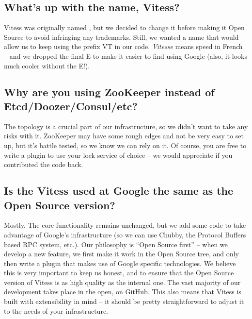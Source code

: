 \subsection{What’s up with the name, Vitess?}\label{whats-up-with-the-name-vitess}

Vitess was originally named , but we decided to change it
before making it Open Source to avoid infringing any
trademarks. Still, we wanted a name that would allow us to keep using
the prefix VT in our code. \emph{Vitesse} means speed in French – and we
dropped the final E to make it easier to find using Google (also, it
looks much cooler without the E!).

\subsection{Why are you using ZooKeeper instead of Etcd/Doozer/Consul/etc?}\hypertarget{why-are-you-using-zookeeper-instead-of-etcddoozerconsuletc}{}\label{why-are-you-using-zookeeper-instead-of-etcddoozerconsuletc}

The topology is a crucial part of our infrastructure, so we didn’t
want to take any risks with it. ZooKeeper may have some rough edges
and not be very easy to set up, but it’s battle tested, so we know we
can rely on it. Of course, you are free to write a plugin to use your
lock service of choice – we would appreciate if you contributed the
code back.

\subsection{Is the Vitess used at Google the same as the Open Source version?}\hypertarget{is-the-vitess-used-at-google-the-same-as-the-open-source-version}{}\label{is-the-vitess-used-at-google-the-same-as-the-open-source-version}

Mostly. The core functionality remains unchanged, but we add some code
to take advantage of Google’s infrastructure (so we can use \cite{web:chubby} Chubby,
the Protocol Buffers based RPC system, etc.). Our philosophy is “Open
Source first” – when we develop a new feature, we first make it work
in the Open Source tree, and only then write a plugin that makes use
of Google specific technologies. We believe this is very important to
keep us honest, and to ensure that the Open Source version of Vitess
is as high quality as the internal one. The vast majority of our
development takes place in the open, on GitHub. This also means that
Vitess is built with extensibility in mind – it should be pretty
straightforward to adjust it to the needs of your infrastructure.

